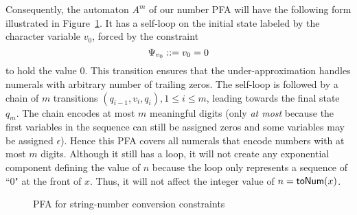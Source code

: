 \documentclass[sigplan,screen]{acmart}
\begin{document}
Consequently, the automaton $A^m$ of our number PFA will have the following form illustrated in Figure~\ref{fig:sfa_its}. 
It has a self-loop on the initial state labeled by the character variable $v_0$, 
forced by the constraint 
$$
\Psi_{v_0}::= v_0=0
$$ 
to hold the value $0$. 
This transition ensures that the under-approximation handles numerals with arbitrary number of trailing zeros.  
The self-loop is followed by a chain of $m$ transitions $(q_{i-1},v_i,q_{i}),1\leq i \leq m$, leading towards the final state $q_m$. 
The chain encodes at most $m$ meaningful digits (only \emph{at most} because the first variables in the sequence can still be assigned zeros and some variables may be assigned $\epsilon$). Hence this PFA covers all numerals that encode numbers with at most $m$ digits.
Although it still has a loop, it will not create any exponential component defining the value of $n$ because the loop only represents a sequence of ``0" at the front of $x$. Thus, it will not affect the integer value of $n=\mbox{\textsf{toNum}($x$)}$.

\begin{figure}
	
	\caption{PFA for string-number conversion constraints}
	\label{fig:sfa_its}
\end{figure}
\end{document}
